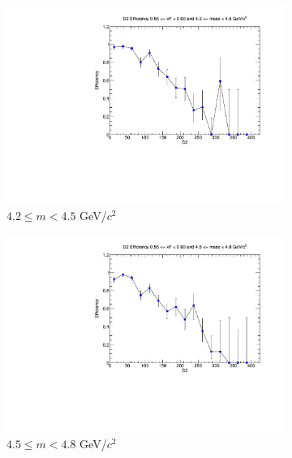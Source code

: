 \begin{figure}[p]
    \centering
    \begin{subfigure}[b]{0.32\textwidth}
        \centering
        \includegraphics[width=\textwidth]{./kTrackerEfficiencyPlots/D2_Efficiency_xF11_mass0.pdf}
        \caption{$4.2 \leq m < 4.5$ GeV/$c^2$}
        \label{fig:xF11_mass0}
    \end{subfigure}
    \hfill
    \begin{subfigure}[b]{0.32\textwidth}
        \centering
        \includegraphics[width=\textwidth]{./kTrackerEfficiencyPlots/D2_Efficiency_xF11_mass1.pdf}
        \caption{$4.5 \leq m < 4.8$ GeV/$c^2$}
        \label{fig:xF11_mass1}
    \end{subfigure}
    \hfill
    \begin{subfigure}[b]{0.32\textwidth}

\end{subfigure}
\end{figure}
